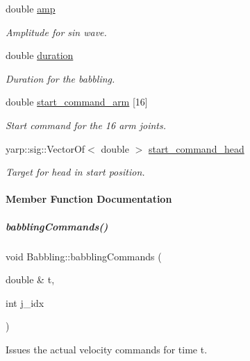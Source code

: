 \begin{DoxyCompactItemize}
double \hyperlink{group__babbling_ab962dd24eb3bd00db6cb7f8a33bb6496}{amp}
\begin{DoxyCompactList}\small\item\em Amplitude for sin wave. \end{DoxyCompactList}\item 
double \hyperlink{group__babbling_a72831e25ddc4b9e79b46dbc25b0923eb}{duration}
\begin{DoxyCompactList}\small\item\em Duration for the babbling. \end{DoxyCompactList}\item 
double \hyperlink{group__babbling_a774931f9e0d4b55f143b69c6ddb8c314}{start\+\_\+command\+\_\+arm} \mbox{[}16\mbox{]}
\begin{DoxyCompactList}\small\item\em Start command for the 16 arm joints. \end{DoxyCompactList}\item 
yarp\+::sig\+::\+Vector\+Of$<$ double $>$ \hyperlink{group__babbling_ab713d81b43bcf7ae0e0b8dc2ad7dfd7f}{start\+\_\+command\+\_\+head}
\begin{DoxyCompactList}\small\item\em Target for head in start position. \end{DoxyCompactList}\end{DoxyCompactItemize}


\paragraph{Member Function Documentation}
\mbox{\label{group__babbling_afcb41e76d1e6dc81d3639a91285c87c0}} 
\subparagraph{\texorpdfstring{babbling\+Commands()}{babblingCommands()}}
{\footnotesize\ttfamily void Babbling\+::babbling\+Commands (\begin{DoxyParamCaption}\item[{double \&}]{t,  }\item[{int}]{j\+\_\+idx }\end{DoxyParamCaption})\hspace{0.3cm}{\ttfamily [protected]}}



Issues the actual velocity commands for time {\ttfamily t}. 


